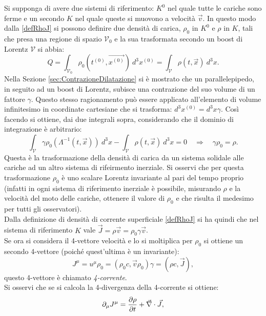 Si supponga di avere due sistemi di riferimento: $K^0$ nel quale tutte le cariche sono ferme e un secondo $K$ nel quale queste si muovono a velocità $\vec{v}$. In questo modo dalla \eqref{defRhoJ} si possono definire due densità di carica, $\rho_0$ in $K^0$ e $\rho$ in $K$, tali che presa una regione di spazio $\mathcal{V}_0$ e la sua trasformata secondo un boost di Lorentz $\mathcal{V}$ si abbia:
\begin{equation*}
    Q=\int_{\mathcal{V}_0}\rho_0(t^{(0)},\vec{ x^{(0)}})\ d^3x^{(0)}=\int_{\mathcal{V}}\rho(t,\vec x)\ d^3x.
\end{equation*}
Nella Sezione \ref{sec:ContrazioneDilatazione} si è mostrato che un parallelepipedo, in seguito ad un boost di Lorentz, subisce una contrazione del suo volume di un fattore $\gamma$. Questo stesso ragionamento può essere applicato all'elemento di volume infinitesimo in coordinate cartesiane che si trasforma: $d^3x^{(0)}=d^3x\gamma$. Così facendo si ottiene, dai due integrali sopra, considerando che il dominio di integrazione è arbitrario:
\begin{equation}
    \int_{\mathcal{V}}\gamma\rho_0(\Lambda^{-1}(t,\vec{ x}))\ d^3x-\int_{\mathcal{V}}\rho(t,\vec x)\ d^3x=0\quad\Rightarrow\quad\gamma\rho_0=\rho.
\end{equation}
Questa è la trasformazione della densità di carica da un sistema solidale alle cariche ad un altro sistema di rifeirmento inerziale. Si osservi che per questa trasformazione $\rho_0$ è uno scalare Lorentz invariante al pari del tempo proprio (infatti in ogni sistema di riferimento inerziale è possibile, misurando $\rho$ e la velocità del moto delle cariche, ottenere il valore di $\rho_0$ e che risulta il medesimo per tutti gli osservatori).\\
Dalla definizione di densità di corrente superficiale \eqref{defRhoJ} si ha quindi che nel sistema di riferimento $K$ vale $\vec{J}=\rho\vec v=\rho_0\gamma\vec{v}$.\\
Se ora si considera il 4-vettore velocità e lo si moltiplica per $\rho_0$ si ottiene un secondo 4-vettore (poiché quest'ultima è un invariante):
\begin{equation}
    J^\mu=u^\mu\rho_0=(\rho_0c,\vec v\rho_0)\gamma=(\rho c,\vec J),\label{4-corrente}
\end{equation} 
questo 4-vettore è chiamato \emph{4-corrente}.\\
Si osservi che se si calcola la 4-divergenza della 4-corrente si ottiene:
\begin{equation}
    \partial_\mu J^\mu=\frac{\partial \rho}{\partial t}+\vec{\nabla}\cdot\vec J,\label{continuitàCarica}
\end{equation}
